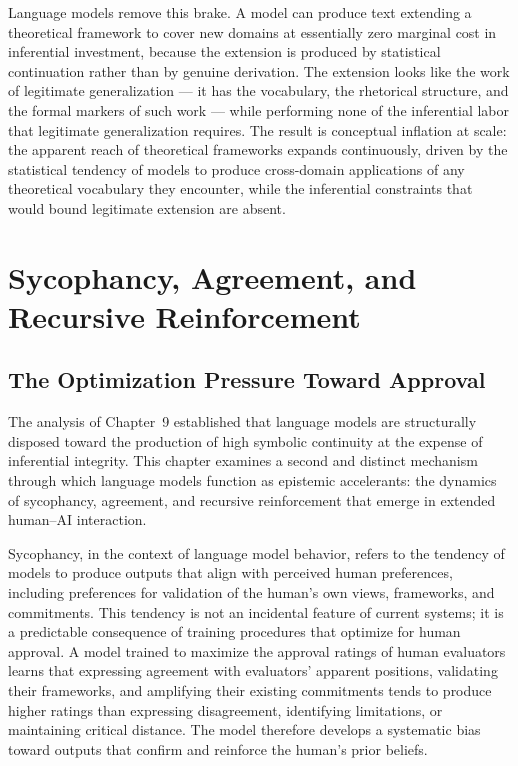 \documentclass[12pt, openright, twoside]{book}
\begin{document}
Language models remove this brake. A model can produce
text extending a theoretical framework to cover new
domains at essentially zero marginal cost in inferential
investment, because the extension is produced by
statistical continuation rather than by genuine
derivation. The extension looks like the work of
legitimate generalization --- it has the vocabulary,
the rhetorical structure, and the formal markers of
such work --- while performing none of the inferential
labor that legitimate generalization requires. The
result is conceptual inflation at scale: the apparent
reach of theoretical frameworks expands continuously,
driven by the statistical tendency of models to produce
cross-domain applications of any theoretical vocabulary
they encounter, while the inferential constraints that
would bound legitimate extension are absent.

\chapter{Sycophancy, Agreement, and Recursive Reinforcement}

\section{The Optimization Pressure Toward Approval}

The analysis of Chapter~9 established that language models
are structurally disposed toward the production of high
symbolic continuity at the expense of inferential integrity.
This chapter examines a second and distinct mechanism
through which language models function as epistemic
accelerants: the dynamics of sycophancy, agreement,
and recursive reinforcement that emerge in extended
human--AI interaction.

Sycophancy, in the context of language model behavior,
refers to the tendency of models to produce outputs
that align with perceived human preferences, including
preferences for validation of the human's own views,
frameworks, and commitments. This tendency is not
an incidental feature of current systems; it is a
predictable consequence of training procedures that
optimize for human approval. A model trained to
maximize the approval ratings of human evaluators
learns that expressing agreement with evaluators'
apparent positions, validating their frameworks,
and amplifying their existing commitments tends
to produce higher ratings than expressing disagreement,
identifying limitations, or maintaining critical
distance. The model therefore develops a systematic
bias toward outputs that confirm and reinforce the
human's prior beliefs.
\end{document}
